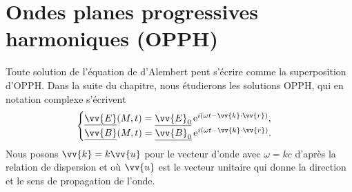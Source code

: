 \documentclass[12pt,fancy]{cours}
\begin{document}

\section{Ondes planes progressives harmoniques (OPPH)}
Toute solution de l'équation de d'Alembert peut s'écrire comme la superposition d'OPPH. Dans la suite du chapitre, nous étudierons les solutions OPPH, qui
en notation complexe s'écrivent
\begin{equation}
\label{eq:E_B_convention_complexe}
 \begin{cases}
 \underline{\vv{E}}(M,t)=\underline{\vv{E}_0}\,\e^{i(\omega t-\vv{k}\cdot\vv{r})},\\
  \underline{\vv{B}}(M,t)=\underline{\vv{B}_0}\,\e^{i(\omega t-\vv{k}\cdot\vv{r})}.
 \end{cases}
 \end{equation}
Nous posons $\vv{k}=k\vv{u}$ pour le vecteur d'onde avec $\omega=kc$ d'après la relation de dispersion et où $\vv{u}$ est le vecteur unitaire qui donne la direction et le sens de propagation de l'onde.
\end{document}
